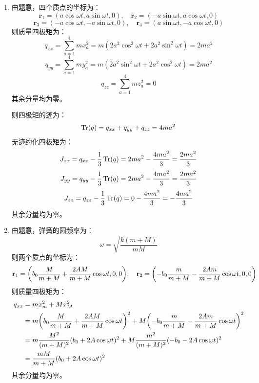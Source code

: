 \documentclass[a4paper]{article}
\begin{document}
\begin{enumerate}
    则四极矩的迹为：
    \[
        \Tr(q) = q_{xx} + q_{yy} + q_{zz} = 4ma^2
    \]
    无迹约化四极矩为：
    \[
        J_{xx} = q_{xx} - \frac{1}{3} \Tr(q) = 2ma^2 - \frac{4ma^2}{3} = \frac{2ma^2}{3}
    \]
    \[
        J_{yy} = q_{yy} - \frac{1}{3} \Tr(q) = 2ma^2 - \frac{4ma^2}{3} = \frac{2ma^2}{3}
    \]
    \[
        J_{zz} = q_{zz} - \frac{1}{3} \Tr(q) = 0 - \frac{4ma^2}{3} = -\frac{4ma^2}{3}
    \]
    其余分量均为零。

    \item[8.(d)]
    由题意，四个质点的坐标为：
    \[
        \mathbf{r}_1 = (a\cos{\omega t}, a\sin{\omega t}, 0),\quad \mathbf{r}_2 = (-a\sin{\omega t}, a\cos{\omega t}, 0)
    \]
    \[
        \mathbf{r}_3 = (-a\cos{\omega t}, -a\sin{\omega t}, 0),\quad \mathbf{r}_4 = (a\sin{\omega t}, -a\cos{\omega t}, 0)
    \]
    则质量四极矩为：
    \[
        q_{xx} = \sum_{a=1}^{4} m x_a^2 = m(2a^2 \cos^2{\omega t} + 2a^2 \sin^2{\omega t}) = 2ma^2
    \]
    \[
        q_{yy} = \sum_{a=1}^{4} m y_a^2 = m(2a^2 \sin^2{\omega t} + 2a^2 \cos^2{\omega t}) = 2ma^2
    \]
    \[
        q_{zz} = \sum_{a=1}^{4} m z_a^2 = 0
    \]
    其余分量均为零。

    则四极矩的迹为：
    \[
        \Tr(q) = q_{xx} + q_{yy} + q_{zz} = 4ma^2
    \]
    无迹约化四极矩为：
    \[
        J_{xx} = q_{xx} - \frac{1}{3} \Tr(q) = 2ma^2 - \frac{4ma^2}{3} = \frac{2ma^2}{3}
    \]
    \[
        J_{yy} = q_{yy} - \frac{1}{3} \Tr(q) = 2ma^2 - \frac{4ma^2}{3} = \frac{2ma^2}{3}
    \]
    \[
        J_{zz} = q_{zz} - \frac{1}{3} \Tr(q) = 0 - \frac{4ma^2}{3} = -\frac{4ma^2}{3}
    \]
    其余分量均为零。

    \item[8.(e)]
    由题意，弹簧的圆频率为：
    \[
        \omega = \sqrt{\frac{k(m + M)}{mM}}
    \]
    则两个质点的坐标为：
    \[
        \mathbf{r}_1 = \qty(b_0 \frac{M}{m + M} + \frac{2AM}{m + M}\cos{\omega t}, 0, 0),\quad \mathbf{r}_2 = \qty(-b_0 \frac{m}{m + M} - \frac{2Am}{m + M}\cos{\omega t}, 0, 0)
    \]
    则质量四极矩为：
    \begin{align*}
        q_{xx}
        &= m x_m^2 + M x_M^2 \\
        &= m\qty(b_0 \frac{M}{m + M} + \frac{2AM}{m + M}\cos{\omega t})^2 + M\qty(-b_0 \frac{m}{m + M} - \frac{2Am}{m + M}\cos{\omega t})^2 \\
        &= m \frac{M^2}{(m + M)^2} (b_0 + 2A\cos{\omega t})^2 + M \frac{m^2}{(m + M)^2} (-b_0 - 2A\cos{\omega t})^2 \\
        &= \frac{mM}{m + M} (b_0 + 2A\cos{\omega t})^2
    \end{align*}
    其余分量均为零。


\end{enumerate}
\end{document}
